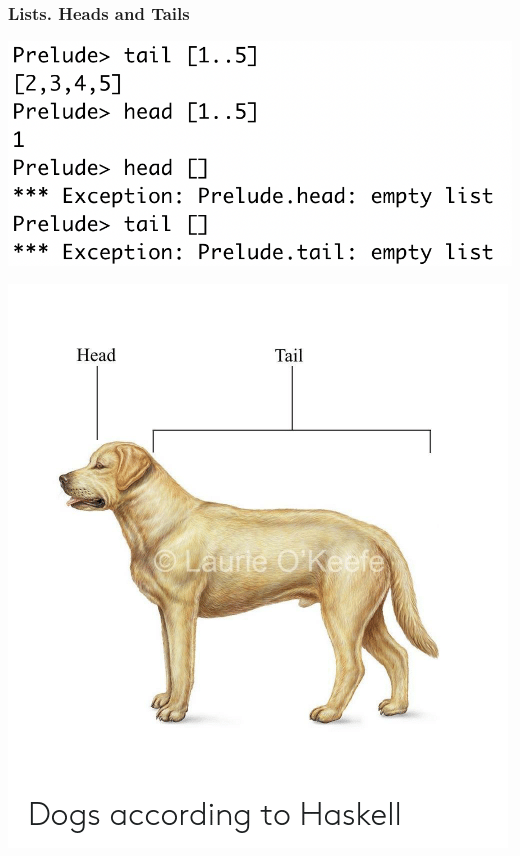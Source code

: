 \documentclass[10pt,pdf,utf8,russian,aspectratio=169]{beamer}
\begin{document}
\begin{frame}
  \frametitle{Lists. Heads and Tails}
  \begin{minipage}{0.5\textwidth}
    \begin{flushleft}
      \begin{center}
      \includegraphics[scale=0.5]{Pics/HeadTail.png}
      \end{center}
    \end{flushleft}
  \end{minipage}\hfill
  \begin{minipage}{0.5\textwidth}
    \begin{flushright}
      \begin{center}
      \includegraphics[scale=0.25]{Pics/Doge.png}
      \end{center}
    \end{flushright}
  \end{minipage}

\end{frame}
\end{document}
